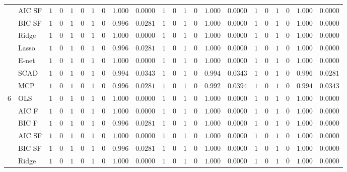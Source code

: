 \begin{tabular}{p{0.2cm}p{1cm}|p{0.6cm}p{0.6cm}|p{0.6cm}p{0.6cm}p{0.6cm}p{0.6cm}p{0.6cm}p{0.6cm}|p{0.6cm}p{0.6cm}p{0.6cm}p{0.6cm}p{0.6cm}p{0.6cm}|p{0.6cm}p{0.6cm}p{0.6cm}p{0.6cm}p{0.6cm}p{0.6cm}}
 & AIC SF  & $1$ & $0$ & $1$ & $0$ & $1$ & $0$ & $1.000$ & $0.0000$ & $1$ & $0$ & $1$ & $0$ & $1.000$ & $0.0000$ & $1$ & $0$ & $1$ & $0$ & $1.000$ & $0.0000$ \\
 & BIC SF  & $1$ & $0$ & $1$ & $0$ & $1$ & $0$ & $0.996$ & $0.0281$ & $1$ & $0$ & $1$ & $0$ & $1.000$ & $0.0000$ & $1$ & $0$ & $1$ & $0$ & $1.000$ & $0.0000$ \\
 & Ridge  & $1$ & $0$ & $1$ & $0$ & $1$ & $0$ & $1.000$ & $0.0000$ & $1$ & $0$ & $1$ & $0$ & $1.000$ & $0.0000$ & $1$ & $0$ & $1$ & $0$ & $1.000$ & $0.0000$ \\
 & Lasso  & $1$ & $0$ & $1$ & $0$ & $1$ & $0$ & $0.996$ & $0.0281$ & $1$ & $0$ & $1$ & $0$ & $1.000$ & $0.0000$ & $1$ & $0$ & $1$ & $0$ & $1.000$ & $0.0000$ \\
 & E-net  & $1$ & $0$ & $1$ & $0$ & $1$ & $0$ & $1.000$ & $0.0000$ & $1$ & $0$ & $1$ & $0$ & $1.000$ & $0.0000$ & $1$ & $0$ & $1$ & $0$ & $1.000$ & $0.0000$ \\
 & SCAD  & $1$ & $0$ & $1$ & $0$ & $1$ & $0$ & $0.994$ & $0.0343$ & $1$ & $0$ & $1$ & $0$ & $0.994$ & $0.0343$ & $1$ & $0$ & $1$ & $0$ & $0.996$ & $0.0281$ \\
 & MCP  & $1$ & $0$ & $1$ & $0$ & $1$ & $0$ & $0.996$ & $0.0281$ & $1$ & $0$ & $1$ & $0$ & $0.992$ & $0.0394$ & $1$ & $0$ & $1$ & $0$ & $0.994$ & $0.0343$ \\\hline
6 & OLS  & $1$ & $0$ & $1$ & $0$ & $1$ & $0$ & $1.000$ & $0.0000$ & $1$ & $0$ & $1$ & $0$ & $1.000$ & $0.0000$ & $1$ & $0$ & $1$ & $0$ & $1.000$ & $0.0000$ \\
 & AIC F  & $1$ & $0$ & $1$ & $0$ & $1$ & $0$ & $1.000$ & $0.0000$ & $1$ & $0$ & $1$ & $0$ & $1.000$ & $0.0000$ & $1$ & $0$ & $1$ & $0$ & $1.000$ & $0.0000$ \\
 & BIC F  & $1$ & $0$ & $1$ & $0$ & $1$ & $0$ & $0.996$ & $0.0281$ & $1$ & $0$ & $1$ & $0$ & $1.000$ & $0.0000$ & $1$ & $0$ & $1$ & $0$ & $1.000$ & $0.0000$ \\
 & AIC SF  & $1$ & $0$ & $1$ & $0$ & $1$ & $0$ & $1.000$ & $0.0000$ & $1$ & $0$ & $1$ & $0$ & $1.000$ & $0.0000$ & $1$ & $0$ & $1$ & $0$ & $1.000$ & $0.0000$ \\
 & BIC SF  & $1$ & $0$ & $1$ & $0$ & $1$ & $0$ & $0.996$ & $0.0281$ & $1$ & $0$ & $1$ & $0$ & $1.000$ & $0.0000$ & $1$ & $0$ & $1$ & $0$ & $1.000$ & $0.0000$ \\
 & Ridge  & $1$ & $0$ & $1$ & $0$ & $1$ & $0$ & $1.000$ & $0.0000$ & $1$ & $0$ & $1$ & $0$ & $1.000$ & $0.0000$ & $1$ & $0$ & $1$ & $0$ & $1.000$ & $0.0000$ \\

\end{tabular}
